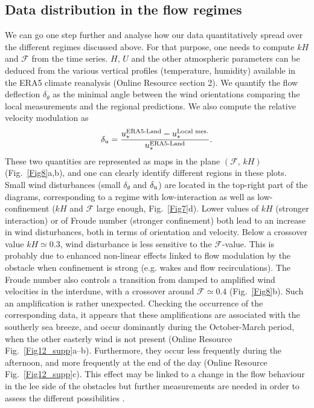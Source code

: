 \subsection{Data distribution in the flow regimes}
\label{DataDistribution}
We can go one step further and analyse how our data quantitatively spread over the different regimes discussed above. For that purpose, one needs to compute $kH$ and $\mathcal{F}$ from the time series. $H$, $U$ and the other atmospheric parameters can be deduced from the various vertical profiles (temperature, humidity) available in the ERA5 climate reanalysis (Online Resource section 2). We quantify the flow deflection $\delta_{\theta}$ as the minimal angle between the wind orientations comparing the local measurements and the regional predictions. We also compute the relative velocity modulation as
%
\begin{equation}
\delta_{\textup{u}} = \frac{u_{*}^{\textup{ERA5-Land}} -  u_{*}^{\textup{Local mes.}}}{u_{*}^{\textup{ERA5-Land}}}.
\end{equation}
%
These two quantities are represented as maps in the plane $(\mathcal{F}, \, kH)$ (Fig.~\ref{Fig8}a,b), and one can clearly identify different regions in these plots. Small wind disturbances (small $\delta_{\theta}$ and $\delta_{\textup{u}}$) are located in the top-right part of the diagrams, corresponding to a regime with low-interaction as well as low-confinement ($k H$ and $\mathcal{F}$ large enough, Fig.~\ref{Fig7}d). Lower values of $k H$ (stronger interaction) or of Froude number (stronger confinement) both lead to an increase in wind disturbances, both in terms of orientation and velocity. Below a crossover value $k H \simeq 0.3$, wind disturbance is less sensitive to the $\mathcal{F}$-value. This is probably due to enhanced non-linear effects linked to flow modulation by the obstacle when confinement is strong (e.g. wakes and flow recirculations). The Froude number also controls a transition from damped to amplified wind velocities in the interdune, with a crossover around $\mathcal{F} \simeq 0.4$ (Fig.~\ref{Fig8}b). Such an amplification is rather unexpected. Checking the occurrence of the corresponding data, it appears that these amplifications are associated with the southerly sea breeze, and occur dominantly during the October-March period, when the other easterly wind is not present (Online Resource Fig.~\ref{Fig12_supp}a--b). Furthermore, they occur less frequently during the afternoon, and more frequently at the end of the day (Online Resource Fig.~\ref{Fig12_supp}c). This effect may be linked to a change in the flow behaviour in the lee side of the obstacles but further measurements are needed in order to assess the different possibilities \citep{baines1995, Vosper2004}.


